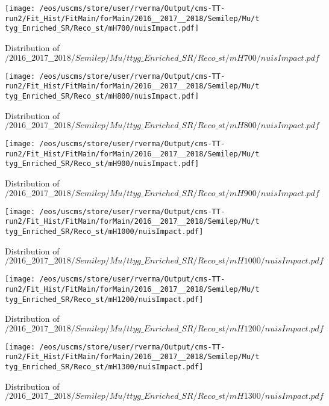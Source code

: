 \begin{figure}
\centering
\texttt{[image: /eos/uscms/store/user/rverma/Output/cms-TT-run2/Fit\_Hist/FitMain/forMain/2016\_\_2017\_\_2018/Semilep/Mu/ttyg\_Enriched\_SR/Reco\_st/mH700/nuisImpact.pdf]}
\caption{Distribution of $/2016\_\_2017\_\_2018/Semilep/Mu/ttyg\_Enriched\_SR/Reco\_st/mH700/nuisImpact.pdf$}
\end{figure}

\begin{figure}
\centering
\texttt{[image: /eos/uscms/store/user/rverma/Output/cms-TT-run2/Fit\_Hist/FitMain/forMain/2016\_\_2017\_\_2018/Semilep/Mu/ttyg\_Enriched\_SR/Reco\_st/mH800/nuisImpact.pdf]}
\caption{Distribution of $/2016\_\_2017\_\_2018/Semilep/Mu/ttyg\_Enriched\_SR/Reco\_st/mH800/nuisImpact.pdf$}
\end{figure}

\begin{figure}
\centering
\texttt{[image: /eos/uscms/store/user/rverma/Output/cms-TT-run2/Fit\_Hist/FitMain/forMain/2016\_\_2017\_\_2018/Semilep/Mu/ttyg\_Enriched\_SR/Reco\_st/mH900/nuisImpact.pdf]}
\caption{Distribution of $/2016\_\_2017\_\_2018/Semilep/Mu/ttyg\_Enriched\_SR/Reco\_st/mH900/nuisImpact.pdf$}
\end{figure}

\begin{figure}
\centering
\texttt{[image: /eos/uscms/store/user/rverma/Output/cms-TT-run2/Fit\_Hist/FitMain/forMain/2016\_\_2017\_\_2018/Semilep/Mu/ttyg\_Enriched\_SR/Reco\_st/mH1000/nuisImpact.pdf]}
\caption{Distribution of $/2016\_\_2017\_\_2018/Semilep/Mu/ttyg\_Enriched\_SR/Reco\_st/mH1000/nuisImpact.pdf$}
\end{figure}

\begin{figure}
\centering
\texttt{[image: /eos/uscms/store/user/rverma/Output/cms-TT-run2/Fit\_Hist/FitMain/forMain/2016\_\_2017\_\_2018/Semilep/Mu/ttyg\_Enriched\_SR/Reco\_st/mH1200/nuisImpact.pdf]}
\caption{Distribution of $/2016\_\_2017\_\_2018/Semilep/Mu/ttyg\_Enriched\_SR/Reco\_st/mH1200/nuisImpact.pdf$}
\end{figure}

\begin{figure}
\centering
\texttt{[image: /eos/uscms/store/user/rverma/Output/cms-TT-run2/Fit\_Hist/FitMain/forMain/2016\_\_2017\_\_2018/Semilep/Mu/ttyg\_Enriched\_SR/Reco\_st/mH1300/nuisImpact.pdf]}
\caption{Distribution of $/2016\_\_2017\_\_2018/Semilep/Mu/ttyg\_Enriched\_SR/Reco\_st/mH1300/nuisImpact.pdf$}
\end{figure}


